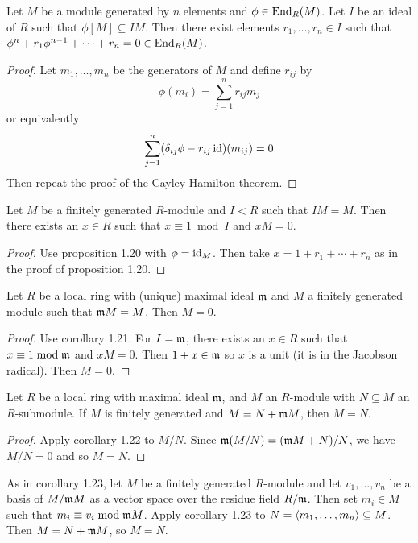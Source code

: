 \begin{prop}[1.20]
	Let $M$ be a module generated by $n$ elements and $\phi \in \operatorname{End}_R(M)$.
	Let $I$ be an ideal of $R$ such that $\phi[M] \subseteq IM$.
	Then there exist elements $r_1,\ldots,r_n \in I$ such that $\phi^n+r_1\phi^{n-1}+\cdots+r_n=0 \in \operatorname{End}_R(M)$.
\end{prop}

\begin{proof}
	Let $m_1,\ldots,m_n$ be the generators of $M$ and define $r_{ij}$ by
	\[\phi(m_i)=\sum_{j=1}^n r_{ij}m_j\]
	or equivalently
	\[\sum_{j=1}^n (\delta_{ij}\phi-r_{ij}\operatorname{id})(m_{ij})=0\]
	Then repeat the proof of the Cayley-Hamilton theorem.
\end{proof}	

\begin{cor}[1.21]
	Let $M$ be a finitely generated $R$-module and $I<R$ such that $IM=M$.
	Then there exists an $x \in R$ such that $x \equiv 1 \bmod I$ and $xM=0$.
\end{cor}

\begin{proof}
	Use proposition 1.20 with $\phi=\operatorname{id}_M$.
	Then take $x=1+r_1+\cdots+r_n$ as in the proof of proposition 1.20.
\end{proof}

\begin{cor}
	Let $R$ be a local ring with (unique) maximal ideal $\mathfrak{m}$ and $M$ a finitely generated module such that $\mathfrak{m} M=M$.
	Then $M=0$.
\end{cor}

\begin{proof}
	Use corollary 1.21.
	For $I=\mathfrak{m}$, there exists an $x \in R$ such that $x \equiv 1 \bmod \mathfrak{m}$ and $xM=0$.
	Then $1+x \in \mathfrak{m}$ so $x$ is a unit (it is in the Jacobson radical).
	Then $M=0$.
\end{proof}

\begin{cor}[1.23]
	Let $R$ be a local ring with maximal ideal $\mathfrak{m}$, and $M$ an $R$-module with $N \subseteq M$ an $R$-submodule.
	If $M$ is finitely generated and $M=N+\mathfrak{m} M$, then $M=N$.
\end{cor}

\begin{proof}
	Apply corollary 1.22 to $M/N$.
	Since $\mathfrak{m}(M/N)=(\mathfrak{m} M+N)/N$, we have $M/N=0$ and so $M=N$.
\end{proof}

\begin{rmk}
	As in corollary 1.23, let $M$ be a finitely generated $R$-module and let $v_1,\ldots,v_n$ be a basis of $M/\mathfrak{m} M$ as a vector space over the residue field $R/\mathfrak{m}$.
	Then set $m_i \in M$ such that $m_i \equiv v_i \bmod \mathfrak{m} M$.
	Apply corollary 1.23 to $N={\left\langle m_1,\ldots,m_n \right\rangle} \subseteq M$.
	Then $M=N+\mathfrak{m} M$, so $M=N$.
\end{rmk}

